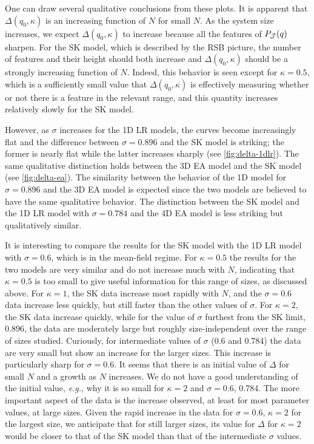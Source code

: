 One can draw several qualitative conclusions from these plots. It is apparent
that $\Delta(q_0,\kappa)$ is an increasing function of $N$ for small $N$. As
the system size increases, we expect $\Delta(q_0,\kappa)$ to increase because
all the features of $P_{\mathcal{J}}(q)$ sharpen. For the SK model, which is
described by the RSB picture, the number of features and their height should
both increase and $\Delta(q_0,\kappa)$ should be a strongly increasing function
of $N$. Indeed, this behavior is seen except for $\kappa=0.5$, which is a
sufficiently small value that $\Delta(q_0,\kappa)$ is effectively measuring
whether or not there is a feature in the relevant range, and this quantity
increases relatively slowly for the SK model.

However, as $\sigma$ increases for the 1D LR models, the curves become
increasingly flat and the difference between $\sigma=0.896$ and the SK model is
striking; the former is nearly flat while the latter increases sharply (see
\cref{fig:delta-1dlr}). The same qualitative distinction holds between the 3D
EA model and the SK model (see \cref{fig:delta-ea}). The similarity between the
behavior of the 1D model for $\sigma=0.896$ and the 3D EA model is expected
since the two models are believed to have the same qualitative behavior.
The distinction between the SK model and the 1D LR model with $\sigma=0.784$
and the 4D EA model is less striking but qualitatively similar.

It is interesting to compare the results for the SK model with the 1D LR model
with $\sigma=0.6$, which is in the mean-field regime. For $\kappa=0.5$ the
results for the two models are very similar and do not increase much with $N$,
indicating that $\kappa=0.5$ is too small to give useful information for this
range of sizes, as discussed above. For $\kappa=1$, the SK data increase most
rapidly with $N$, and the $\sigma=0.6$ data increase less quickly, but still
faster than the other values of $\sigma$. For $\kappa=2$, the SK data increase
quickly, while for the value of $\sigma$ furthest from the SK limit, 0.896, the
data are moderately large but roughly size-independent over the range of sizes
studied. Curiously, for intermediate values of $\sigma$ (0.6 and 0.784) the
data are very small but show an increase for the larger sizes. This increase is
particularly sharp for $\sigma=0.6$. It seems that there is an initial value of
$\Delta$ for small $N$ and a growth as $N$ increases. We do not have a good
understanding of the initial value, \emph{e.g.}, why it is so small for
$\kappa=2$ and $\sigma=0.6$, 0.784. The more important aspect of the data is
the increase observed, at least for most parameter values, at large sizes.
Given the rapid increase in the data for $\sigma=0.6$, $\kappa=2$ for the
largest size, we anticipate that for still larger sizes, its value for $\Delta$
for $\kappa=2$ would be closer to that of the SK model than that of the
intermediate $\sigma$ values.

